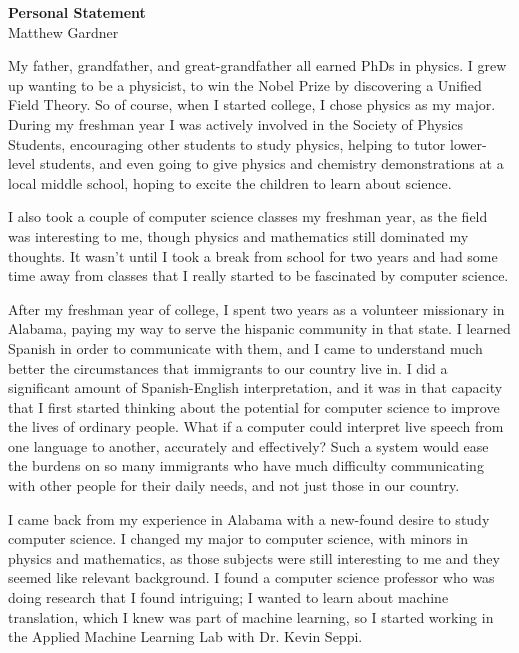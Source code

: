\documentclass[onecolumn, 12pt]{article}
\begin{document}
\pagestyle{empty}

\begin{center}
  \textbf{Personal Statement}\\
  Matthew Gardner
\end{center}

My father, grandfather, and great-grandfather all earned PhDs in physics.  I
grew up wanting to be a physicist, to win the Nobel Prize by discovering a
Unified Field Theory.  So of course, when I started college, I chose physics as
my major.  During my freshman year I was actively involved in the Society of
Physics Students, encouraging other students to study physics, helping to tutor
lower-level students, and even going to give physics and chemistry
demonstrations at a local middle school, hoping to excite the children to learn
about science.

I also took a couple of computer science classes my freshman year, as the field
was interesting to me, though physics and mathematics still dominated my
thoughts.  It wasn't until I took a break from school for two years and had
some time away from classes that I really started to be fascinated by computer
science.

After my freshman year of college, I spent two years as a volunteer missionary
in Alabama, paying my way to serve the hispanic community in that state.  I
learned Spanish in order to communicate with them, and I came to understand
much better the circumstances that immigrants to our country live in.  I did a
significant amount of Spanish-English interpretation, and it was in that
capacity that I first started thinking about the potential for computer science
to improve the lives of ordinary people.  What if a computer could interpret
live speech from one language to another, accurately and effectively?  Such a
system would ease the burdens on so many immigrants who have much difficulty
communicating with other people for their daily needs, and not just those in
our country.

I came back from my experience in Alabama with a new-found desire to study
computer science.  I changed my major to computer science, with minors in
physics and mathematics, as those subjects were still interesting to me and
they seemed like relevant background.  I found a computer science professor who
was doing research that I found intriguing; I wanted to learn about machine
translation, which I knew was part of machine learning, so I started working in
the Applied Machine Learning Lab with Dr. Kevin Seppi.
\end{document}
